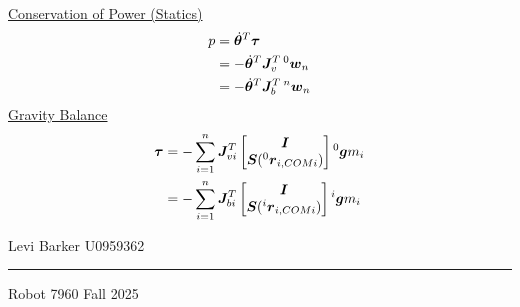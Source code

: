 \documentclass[twocolumn]{article}    %
\begin{document}
\newpage
\noindent\underline{Conservation of Power (Statics)}
\begin{align*}
    p &= \dot{\bm{\theta}}^T\bm{\tau} \\
    &= -\dot{\bm{\theta}}^T\bm{J}_v^T\prescript{0}{}{\bm{w}}_n \\
    &= -\dot{\bm{\theta}}^T\bm{J}_b^T\prescript{n}{}{\bm{w}}_n 
\end{align*}
\noindent\underline{Gravity Balance}
\begin{align*}
    \bm{\tau} &= -\sum_{i=1}^n \bm{J}_{vi}^T\begin{bmatrix}
        \bm{I} \\ \bm{S}(\prescript{0}{}{\bm{r}}_{i,COMi})
    \end{bmatrix} \prescript{0}{}{\bm{g}}m_i \\
    &= -\sum_{i=1}^n \bm{J}_{bi}^T\begin{bmatrix}
        \bm{I} \\ \bm{S}(\prescript{i}{}{\bm{r}}_{i,COMi})
    \end{bmatrix} \prescript{i}{}{\bm{g}}m_i
\end{align*}
\vfill
\begin{center}    
    Levi Barker \hspace{82pt} U0959362 \\ \vspace{2pt}
    \hrule
    \vspace{2pt}
    Robot 7960 \hspace{85pt} Fall 2025
\end{center}
\end{document}
